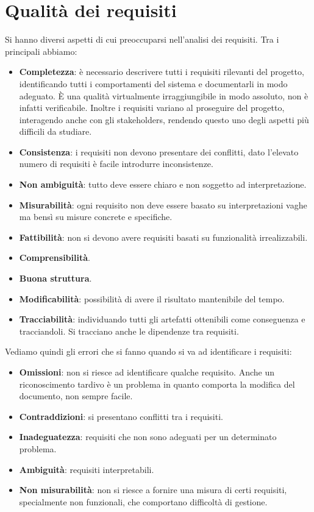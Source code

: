 \section{Qualità dei requisiti}
Si hanno diversi aspetti di cui preoccuparsi nell'analisi dei requisiti. Tra i
principali abbiamo:
\begin{itemize}
      \item \textbf{Completezza}: è necessario descrivere tutti i requisiti
            rilevanti del progetto, identificando tutti i comportamenti del sistema
            e documentarli in modo adeguato. È una qualità virtualmente
            irraggiungibile in modo assoluto, non è infatti verificabile. Inoltre
            i requisiti variano al proseguire del progetto, interagendo anche
            con gli stakeholders, rendendo questo uno degli aspetti più difficili
            da studiare.
      \item \textbf{Consistenza}: i requisiti non devono presentare dei conflitti,
            dato l'elevato numero di requisiti è facile introdurre inconsistenze.
      \item \textbf{Non ambiguità}: tutto deve essere chiaro e non soggetto ad
            interpretazione.
      \item \textbf{Misurabilità}: ogni requisito non deve essere basato su
            interpretazioni vaghe ma bensì su misure concrete e specifiche.
      \item \textbf{Fattibilità}: non si devono avere requisiti basati su
            funzionalità irrealizzabili.
      \item \textbf{Comprensibilità}.
      \item \textbf{Buona struttura}.
      \item \textbf{Modificabilità}: possibilità di avere il risultato mantenibile
            del tempo.
      \item \textbf{Tracciabilità}: individuando tutti gli artefatti ottenibili
            come conseguenza e tracciandoli. Si tracciano anche le dipendenze
            tra requisiti.
\end{itemize}
Vediamo quindi gli errori che si fanno quando si va ad identificare i requisiti:
\begin{itemize}
      \item \textbf{Omissioni}: non si riesce ad identificare qualche requisito.
            Anche un riconoscimento tardivo è un problema in quanto comporta la
            modifica del documento, non sempre facile.
      \item \textbf{Contraddizioni}: si presentano conflitti tra i requisiti.
      \item \textbf{Inadeguatezza}: requisiti che non sono adeguati per un
            determinato problema.
      \item \textbf{Ambiguità}: requisiti interpretabili.
      \item \textbf{Non misurabilità}: non si riesce a fornire una misura di
            certi requisiti, specialmente non funzionali, che comportano
            difficoltà di gestione.
\end{itemize}
